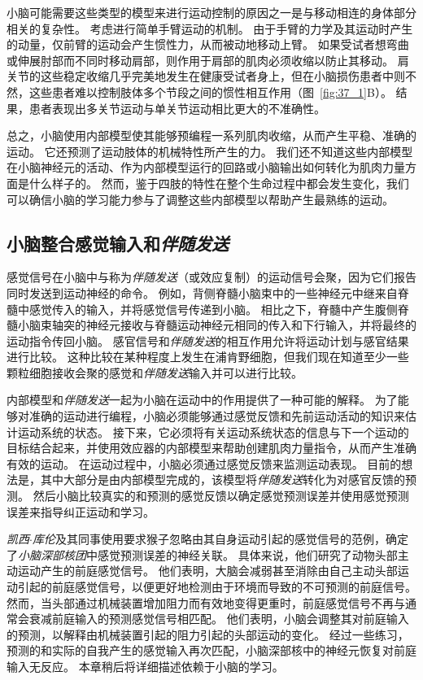 小脑可能需要这些类型的模型来进行运动控制的原因之一是与移动相连的身体部分相关的复杂性。
考虑进行简单手臂运动的机制。
由于手臂的力学及其运动时产生的动量，仅前臂的运动会产生惯性力，从而被动地移动上臂。
如果受试者想弯曲或伸展肘部而不同时移动肩部，则作用于肩部的肌肉必须收缩以防止其移动。
肩关节的这些稳定收缩几乎完美地发生在健康受试者身上，但在小脑损伤患者中则不然，这些患者难以控制肢体多个节段之间的惯性相互作用（图~\ref{fig:37_1}B）。
结果，患者表现出多关节运动与单关节运动相比更大的不准确性。


总之，小脑使用内部模型使其能够预编程一系列肌肉收缩，从而产生平稳、准确的运动。
它还预测了运动肢体的机械特性所产生的力。 我们还不知道这些内部模型在小脑神经元的活动、作为内部模型运行的回路或小脑输出如何转化为肌肉力量方面是什么样子的。
然而，鉴于四肢的特性在整个生命过程中都会发生变化，我们可以确信小脑的学习能力参与了调整这些内部模型以帮助产生最熟练的运动。



\subsection{小脑整合感觉输入和\textit{伴随发送}}

感觉信号在小脑中与称为\textit{伴随发送}（或效应复制）的运动信号会聚，因为它们报告同时发送到运动神经的命令。
例如，背侧脊髓小脑束中的一些神经元中继来自脊髓中感觉传入的输入，并将感觉信号传递到小脑。
相比之下，脊髓中产生腹侧脊髓小脑束轴突的神经元接收与脊髓运动神经元相同的传入和下行输入，并将最终的运动指令传回小脑。
感官信号和\textit{伴随发送}的相互作用允许将运动计划与感官结果进行比较。
这种比较在某种程度上发生在浦肯野细胞，但我们现在知道至少一些颗粒细胞接收会聚的感觉和\textit{伴随发送}输入并可以进行比较。


内部模型和\textit{伴随发送}一起为小脑在运动中的作用提供了一种可能的解释。
为了能够对准确的运动进行编程，小脑必须能够通过感觉反馈和先前运动活动的知识来估计运动系统的状态。
接下来，它必须将有关运动系统状态的信息与下一个运动的目标结合起来，并使用效应器的内部模型来帮助创建肌肉力量指令，从而产生准确有效的运动。
在运动过程中，小脑必须通过感觉反馈来监测运动表现。
目前的想法是，其中大部分是由内部模型完成的，该模型将\textit{伴随发送}转化为对感官反馈的预测。
然后小脑比较真实的和预测的感觉反馈以确定感觉预测误差并使用感觉预测误差来指导纠正运动和学习。


\textit{凯西$\cdot$库伦}及其同事使用要求猴子忽略由其自身运动引起的感觉信号的范例，确定了\textit{小脑深部核团}中感觉预测误差的神经关联。
具体来说，他们研究了动物头部主动运动产生的前庭感觉信号。
他们表明，大脑会减弱甚至消除由自己主动头部运动引起的前庭感觉信号，以便更好地检测由于环境而导致的不可预测的前庭信号。
然而，当头部通过机械装置增加阻力而有效地变得更重时，前庭感觉信号不再与通常会衰减前庭输入的预测感觉信号相匹配。
他们表明，小脑会调整其对前庭输入的预测，以解释由机械装置引起的阻力引起的头部运动的变化。
经过一些练习，预测的和实际的自我产生的感觉输入再次匹配，小脑深部核中的神经元恢复对前庭输入无反应。
本章稍后将详细描述依赖于小脑的学习。



